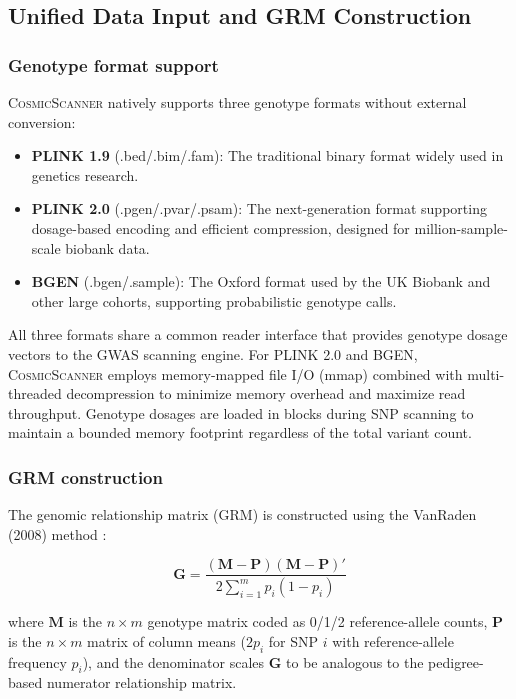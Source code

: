 \documentclass[11pt,a4paper]{article}
\newcommand{\CosmicScanner}{\textsc{CosmicScanner}}
\begin{document}
\subsection{Unified Data Input and GRM Construction}

\subsubsection{Genotype format support}

\CosmicScanner{} natively supports three genotype formats without external conversion:

\begin{itemize}
\item \textbf{PLINK 1.9} (.bed/.bim/.fam): The traditional binary format widely used in genetics research.
\item \textbf{PLINK 2.0} (.pgen/.pvar/.psam): The next-generation format supporting dosage-based encoding and efficient compression, designed for million-sample-scale biobank data.
\item \textbf{BGEN} (.bgen/.sample): The Oxford format used by the UK Biobank and other large cohorts, supporting probabilistic genotype calls.
\end{itemize}

All three formats share a common reader interface that provides genotype dosage vectors to the GWAS scanning engine. For PLINK 2.0 and BGEN, \CosmicScanner{} employs memory-mapped file I/O (mmap) combined with multi-threaded decompression to minimize memory overhead and maximize read throughput. Genotype dosages are loaded in blocks during SNP scanning to maintain a bounded memory footprint regardless of the total variant count.

\subsubsection{GRM construction}

The genomic relationship matrix (GRM) is constructed using the VanRaden (2008) method \citep{vanraden2008}:

\begin{equation}
\mathbf{G} = \frac{(\mathbf{M} - \mathbf{P})(\mathbf{M} - \mathbf{P})'}{2 \sum_{i=1}^{m} p_i (1 - p_i)}
\label{eq:grm}
\end{equation}

where $\mathbf{M}$ is the $n \times m$ genotype matrix coded as 0/1/2 reference-allele counts, $\mathbf{P}$ is the $n \times m$ matrix of column means ($2p_i$ for SNP $i$ with reference-allele frequency $p_i$), and the denominator scales $\mathbf{G}$ to be analogous to the pedigree-based numerator relationship matrix.
\end{document}
